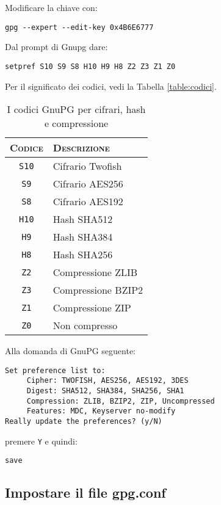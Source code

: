 Modificare la chiave con:

\begin{lstlisting}
gpg --expert --edit-key 0x4B6E6777
\end{lstlisting}

Dal prompt di Gnupg dare:

\begin{lstlisting}
setpref S10 S9 S8 H10 H9 H8 Z2 Z3 Z1 Z0
\end{lstlisting}

Per il significato dei codici, vedi la Tabella \vref{table:codici}.

\begin{table}
   \centering
	\begin{tabularx}{6cm}{cl}
 		\toprule
		\textsc{Codice} & \textsc{Descrizione} \\
		\midrule
		\texttt{S10} & Cifrario Twofish \\
		\texttt{S9}  & Cifrario AES256 \\
		\texttt{S8}  & Cifrario AES192 \\
		\texttt{H10} & Hash SHA512 \\
		\texttt{H9}  & Hash SHA384 \\
		\texttt{H8}  & Hash SHA256 \\
		\texttt{Z2}  & Compressione ZLIB \\
		\texttt{Z3}  & Compressione BZIP2 \\
		\texttt{Z1}  & Compressione ZIP \\
		\texttt{Z0}  & Non compresso \\
		\bottomrule
	\end{tabularx}
	\caption{I codici GnuPG per cifrari, hash e compressione}
	\label{table:codici}
\end{table}

Alla domanda di GnuPG seguente:

\begin{lstlisting}
Set preference list to:
     Cipher: TWOFISH, AES256, AES192, 3DES
     Digest: SHA512, SHA384, SHA256, SHA1
     Compression: ZLIB, BZIP2, ZIP, Uncompressed
     Features: MDC, Keyserver no-modify
Really update the preferences? (y/N)
\end{lstlisting}

premere \texttt{Y} e quindi:

\begin{lstlisting}
save
\end{lstlisting}

\subsection{Impostare il file gpg.conf}

